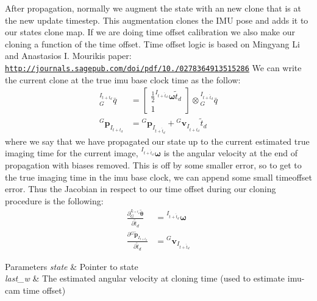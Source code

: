 After propagation, normally we augment the state with an new clone that is at the new update timestep. This augmentation clones the I\+MU pose and adds it to our state\textquotesingle{}s clone map. If we are doing time offset calibration we also make our cloning a function of the time offset. Time offset logic is based on Mingyang Li and Anastasios I. Mourikis paper\+: \href{http://journals.sagepub.com/doi/pdf/10.1177/0278364913515286}{\tt http\+://journals.\+sagepub.\+com/doi/pdf/10./0278364913515286} We can write the current clone at the true imu base clock time as the follow\+: \begin{align*} {}^{I_{t+t_d}}_G\bar{q} &= \begin{bmatrix}\frac{1}{2} {}^{I_{t+\hat{t}_d}}\boldsymbol\omega \tilde{t}_d \\ 1\end{bmatrix}\otimes{}^{I_{t+\hat{t}_d}}_G\bar{q} \\ {}^G\mathbf{p}_{I_{t+t_d}} &= {}^G\mathbf{p}_{I_{t+\hat{t}_d}} + {}^G\mathbf{v}_{I_{t+\hat{t}_d}}\tilde{t}_d \end{align*} where we say that we have propagated our state up to the current estimated true imaging time for the current image, ${}^{I_{t+\hat{t}_d}}\boldsymbol\omega$ is the angular velocity at the end of propagation with biases removed. This is off by some smaller error, so to get to the true imaging time in the imu base clock, we can append some small timeoffset error. Thus the Jacobian in respect to our time offset during our cloning procedure is the following\+: \begin{align*} \frac{\partial {}^{I_{t+t_d}}_G\tilde{\boldsymbol\theta}}{\partial \tilde{t}_d} &= {}^{I_{t+\hat{t}_d}}\boldsymbol\omega \\ \frac{\partial {}^G\tilde{\mathbf{p}}_{I_{t+t_d}}}{\partial \tilde{t}_d} &= {}^G\mathbf{v}_{I_{t+\hat{t}_d}} \end{align*}


\begin{DoxyParams}{Parameters}
{\em state} & Pointer to state \\
\hline
{\em last\+\_\+w} & The estimated angular velocity at cloning time (used to estimate imu-\/cam time offset) \\
\hline
\end{DoxyParams}
\mbox{\label{classov__msckf_1_1StateHelper_a3aecb942a1d9bb7dec915fdad303acc8}} 
